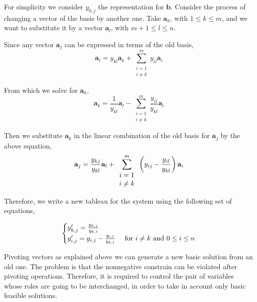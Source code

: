 For simplicity we consider $y_{0,j}$ the representation for $\mathbf{b}$. Consider the process of changing a vector of the basis by another one. Take $\mathbf{a}_k$, with $1\leq k \leq m$, and we want to substitute it by a vector $\mathbf{a}_l$, with $m+1\leq l \leq n$.

Since any vector $\mathbf{a}_j$ can be expressed in terms of the old basis,
\begin{equation*}
	\mathbf{a}_l = y_{kl}\mathbf{a}_k+\sum_{\begin{array}{c}
		i=1\\i\neq k
		\end{array}}^{m} y_{il}\mathbf{a}_{i}
\end{equation*}

From which we solve for $\mathbf{a}_k$,
\begin{equation*}
	\mathbf{a}_k=\frac{1}{y_{kl}}\mathbf{a}_l-\sum_{\begin{array}{c}i=1\\i\neq k\end{array}}^{m} \frac{y_{il}}{y_{kl}}\mathbf{a}_{i}
\end{equation*}

Then we substitute $\mathbf{a}_{k}$ in the linear combination of the old basis for $\mathbf{a}_j$ by the above equation,
\begin{equation*}
	\mathbf{a}_j =\frac{y_{kj}}{y_{kl}}\mathbf{a}_l+\sum_{\begin{array}{c}
			i=1 \\ i\neq k
		\end{array}}^{m}\left( y_{ij}-\frac{y_{il}}{y_{kl}} \right)\mathbf{a}_i
\end{equation*} 

Therefore, we write a new tableau for the system using the following set of equations,

\begin{equation}
	\begin{cases}
	y'_{k,j}= \frac{y_{k,j}}{y_{k,l}} & \\
	y'_{i,j}= y_{i,j}-\frac{y_{i,l}}{y_{k,l}} &  \text{ for }i\neq k \ \mathrm{and} \ 0\leq i\leq n 
	\end{cases}
\end{equation}


Pivoting vectors as explained above we can generate a new basic solution from an old one. The problem is that the nonnegative constrain can be violated after pivoting operations. Therefore, it is required to control the pair of variables whose roles are going to be interchanged, in order to take in account only basic feasible solutions.


